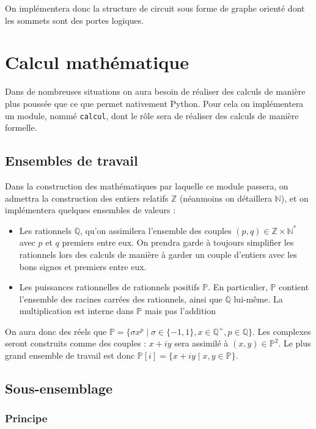 \documentclass[french]{article}
\newcommand{\p}{\texttt} %
\begin{document}
On implémentera donc la structure de circuit sous forme de graphe orienté dont les sommets sont des portes logiques.


\section{Calcul mathématique}


Dans de nombreuses situations on aura besoin de réaliser des calculs de manière plus poussée que ce que permet nativement Python. Pour cela on implémentera un module, nommé \p{calcul}, dont le rôle sera de réaliser des calculs de manière formelle.

\subsection{Ensembles de travail} \label{ensembles}


Dans la construction des mathématiques par laquelle ce module passera, on admettra la construction des entiers relatifs $\mathbb{Z}$ (néanmoins on détaillera $\mathbb{N}$), et on implémentera quelques ensembles de valeurs :
\begin{itemize}
    \item Les rationnels $\mathbb{Q}$, qu'on assimilera l'ensemble des couples $(p, q) \in \mathbb{Z} \times \mathbb{N}^*$ avec $p$ et $q$ premiers entre eux. On prendra garde à toujours simplifier les rationnels lors des calculs de manière à garder un couple d'entiers avec les bons signes et premiers entre eux.
    \item Les puissances rationnelles de rationnels positifs $\mathbb{P}$. En particulier, $\mathbb{P}$ contient l'ensemble des racines carrées des rationnels, ainsi que $\mathbb{Q}$ lui-même. La multiplication est interne dans $\mathbb{P}$ mais pas l'addition
\end{itemize}

On aura donc des réels que $\mathbb{P} = \{\sigma x^p \mid \sigma \in \{-1, 1\}, x \in \mathbb{Q}^+, p \in \mathbb{Q}\}$. Les complexes seront construits comme des couples : $x + iy$ sera assimilé à $(x, y) \in \mathbb{P}^2$. Le plus grand ensemble de travail est donc $\mathbb{P}[i] = \{x + iy \mid x, y \in \mathbb{P}\}$.

\subsection{Sous-ensemblage}

\subsubsection{Principe}
\end{document}
